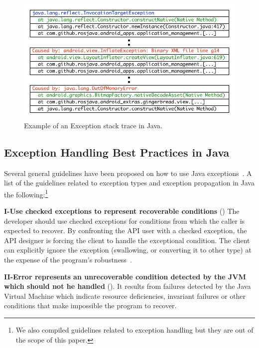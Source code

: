 \documentclass[conference]{IEEEtran}
\begin{document}
\begin{figure} \centering \includegraphics[scale=0.6]{wrappings}
\caption{Example of an Exception stack trace in Java.}
\label{fig:wrapping}
\end{figure}

\subsection{Exception Handling Best Practices in Java}
\label{sec:best}

Several general guidelines have been proposed on how to use Java
exceptions~\cite{mandrioli1992advances,gosling2000java,wirfs2006toward,
bloch2008effective}. 
A list of the guidelines related to exception types and exception
propagation in Java the following:\footnote{We also compiled guidelines related
to exception handling but they are out of the scope of this paper.}


\textbf{I-Use checked exceptions to represent recoverable
conditions} (\cite{mandrioli1992advances,gosling2000java,wirfs2006toward,bloch2008effective})
The developer should use checked exceptions for conditions from which the caller
is expected to recover. By confronting the API user with a checked exception,
the API designer is forcing the client to handle the exceptional condition. The
client can explicitly ignore the exception (swallowing, or converting it to
other type) at the expense of the program's robustness~\cite{gosling2000java}.

\textbf{II-Error represents an unrecoverable condition detected by the JVM which
should not he handled} (\cite{gosling2000java}). It results from failures detected
by the Java Virtual Machine which indicate resource deficiencies, invariant
failures or other conditions that make impossible the program to recover.
\end{document}
